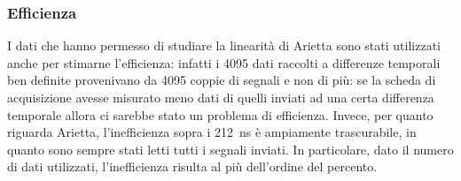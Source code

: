 \subsubsection{Efficienza}
I dati che hanno permesso di studiare la linearità di Arietta sono stati utilizzati anche per stimarne l'efficienza: infatti i 4095 dati raccolti a differenze temporali ben definite provenivano da  4095 coppie di segnali e non di più: se la scheda di acquisizione avesse misurato meno dati di quelli inviati ad una certa differenza temporale allora ci sarebbe stato un problema di efficienza. 
Invece, per quanto riguarda Arietta, l'inefficienza sopra i \SI{212}{\ns} è ampiamente trascurabile, in quanto sono sempre stati letti tutti i segnali inviati. In particolare, dato il  numero di  dati utilizzati, l'inefficienza risulta al più dell'ordine del percento.
